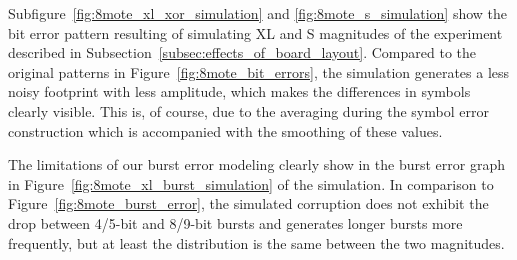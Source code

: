 Subfigure~\ref{fig:8mote_xl_xor_simulation} and \ref{fig:8mote_s_simulation} show the bit error pattern resulting of simulating XL and S magnitudes of the experiment described in Subsection~\ref{subsec:effects_of_board_layout}.
Compared to the original patterns in Figure~\ref{fig:8mote_bit_errors}, the simulation generates a less noisy footprint with less amplitude, which makes the differences in symbols clearly visible.
This is, of course, due to the averaging during the symbol error construction which is accompanied with the smoothing of these values.

The limitations of our burst error modeling clearly show in the burst error graph in Figure~\ref{fig:8mote_xl_burst_simulation} of the simulation. In comparison to Figure~\ref{fig:8mote_burst_error}, the simulated corruption does not exhibit the drop between 4/5-bit and 8/9-bit bursts and generates longer bursts more frequently, but at least the distribution is the same between the two magnitudes.

